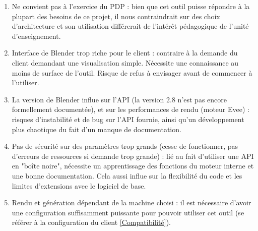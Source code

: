 \documentclass[a4paper]{article}
\begin{document}
    \begin{enumerate}
                
                \item {Ne convient pas à l'exercice du PDP :}
                bien que cet outil puisse répondre à la plupart des besoins de ce projet, il nous contraindrait sur des choix d'architecture et son utilisation différerait de l'intérêt pédagogique de l'unité d'enseignement.
                
                \item {Interface de Blender trop riche pour le client :}
                contraire à la demande du client demandant une visualisation simple. Nécessite une connaissance au moins de surface de l'outil. Risque de refus à envisager avant de commencer à l'utiliser.
                
                \item {La version de Blender influe sur l'API (la version 2.8 n'est pas encore formellement documentée), et sur les performances de rendu (moteur Evee) :}
                risques d'instabilité et de bug sur l'API fournie, ainsi qu'un développement plus chaotique du fait d'un manque de documentation.
                
                \item {Pas de sécurité sur des paramètres trop grands (cesse de fonctionner, pas d'erreurs de ressources si demande trop grande) :}
                lié au fait d'utiliser une API en "boîte noire", nécessite un apprentissage des fonctions du moteur interne et une bonne documentation. Cela aussi influe sur la flexibilité du code et les limites d'extensions avec le logiciel de base.
                
                \item {Rendu et génération dépendant de la machine choisi :}
                il est nécessaire d'avoir une configuration suffisamment puissante pour pouvoir utiliser cet outil (se référer à la configuration du client \ref{Compatibilité}).
                
    \end{enumerate}
    
\end{document}
